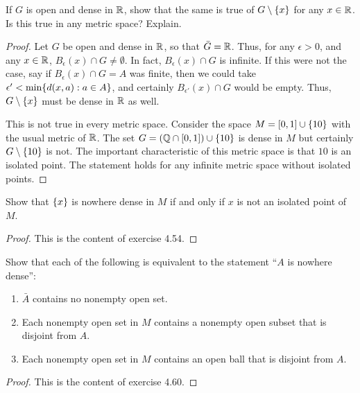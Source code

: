 \begin{exercise}{15}
If $G$ is open and dense in $\mathbb{R}$, show that the same is true of $G\setminus\{x\}$ for any $x\in\mathbb{R}$. 
Is this true in any metric space?
Explain.
\end{exercise}
\begin{proof}
Let $G$ be open and dense in $\mathbb{R}$, so that $\bar{G}=\mathbb{R}$.
Thus, for any $\epsilon>0$, and any $x\in\mathbb{R}$, $B_\epsilon(x)\cap G\neq \emptyset$.
In fact, $B_\epsilon(x)\cap G$ is infinite.
If this were not the case, say if $B_\epsilon(x)\cap G = A$ was finite, then we could take $\epsilon' < \min\{d(x,a): a\in A\}$, and certainly $B_{\epsilon'}(x)\cap G$ would be empty. 
Thus, $G\setminus\{x\}$ must be dense in $\mathbb{R}$ as well.

This is not true in every metric space.
Consider the space $M=[0,1]\cup \{10\}$ with the usual metric of $\mathbb{R}$.
The set $G = (\mathbb{Q}\cap[0,1]) \cup \{10\}$ is dense in $M$ but certainly $G\setminus\{10\}$ is not.
The important characteristic of this metric space is that $10$ is an isolated point.
The statement holds for any infinite metric space without isolated points.
\end{proof} 

\begin{exercise}{16}
Show that $\{x\}$ is nowhere dense in $M$ if and only if $x$ is not an isolated point of $M$.
\end{exercise}
\begin{proof}
This is the content of exercise 4.54.
\end{proof} 

\begin{exercise}{19}
Show that each of the following is equivalent to the statement ``$A$ is nowhere dense'':
\begin{enumerate}
    \item $\bar{A}$ contains no nonempty open set.
    \item Each nonempty open set in $M$ contains a nonempty open subset that is disjoint from $A$.
    \item Each nonempty open set in $M$ contains an open ball that is disjoint from $A$.
\end{enumerate}
\end{exercise}
\begin{proof}
This is the content of exercise 4.60.
\end{proof} 

